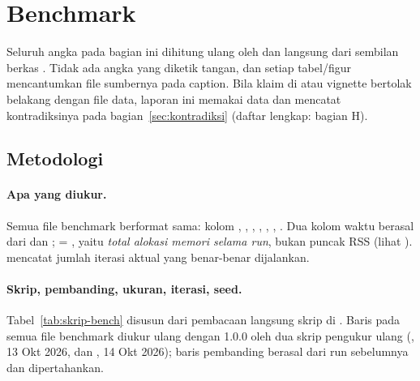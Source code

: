 \section{Benchmark}\label{sec:benchmark}

Seluruh angka pada bagian ini dihitung ulang oleh
 dan  langsung dari
sembilan berkas . Tidak ada angka yang diketik tangan,
dan setiap tabel/figur mencantumkan file sumbernya pada caption. Bila klaim di
 atau vignette bertolak belakang dengan file data, laporan ini
memakai data dan mencatat kontradiksinya pada bagian~\ref{sec:kontradiksi}
(daftar lengkap:  bagian H).

\subsection{Metodologi}\label{sec:metodologi-bench}

\paragraph{Apa yang diukur.}
Semua file benchmark berformat sama: kolom ,
, , ,
, , . Dua kolom waktu berasal dari
 dan ;  =
, yaitu \emph{total alokasi memori
selama run}, bukan puncak RSS (lihat ).
 mencatat jumlah iterasi aktual yang benar-benar dijalankan.

\paragraph{Skrip, pembanding, ukuran, iterasi, seed.}
Tabel~\ref{tab:skrip-bench} disusun dari pembacaan langsung skrip di
. Baris  pada semua file benchmark diukur ulang
dengan  1.0.0 oleh dua skrip pengukur ulang
(, 13 Okt 2026, dan
, 14 Okt 2026); baris pembanding berasal dari
run sebelumnya dan dipertahankan.


